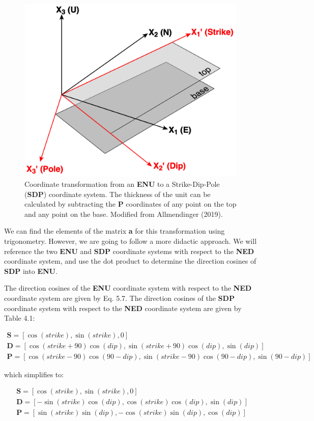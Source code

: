 \documentclass[a4paper , 12pt]{book}
\begin{document}
 \begin{figure}[H]
    \centering
    \includegraphics[width=11cm]{Figures/ch5f3.png}
    \caption{Coordinate transformation from an \textbf{ENU} to a Strike-Dip-Pole (\textbf{SDP}) coordinate system. The thickness of the unit can be calculated by subtracting the \textbf{P} coordinates of any point on the top and any point on the base. Modified from Allmendinger (2019).}
\end{figure}

We can find the elements of the matrix \textbf{a} for this transformation using trigonometry. However, we are going to follow a more didactic approach. We will reference the two \textbf{ENU} and \textbf{SDP} coordinate systems with respect to the \textbf{NED} coordinate system, and use the dot product to determine the direction cosines of \textbf{SDP} into \textbf{ENU}. 

The direction cosines of the \textbf{ENU} coordinate system with respect to the \textbf{NED} coordinate system are given by Eq. 5.7. The direction cosines of the \textbf{SDP} coordinate system with respect to the \textbf{NED} coordinate system are given by Table 4.1:

\begin{gather*}
    \mathbf{S} = [\cos(strike),\sin(strike),0] \\
    \mathbf{D} = [\cos(strike+90)\cos(dip),\sin(strike+90)\cos(dip),\sin(dip)] \\
    \mathbf{P} = [\cos(strike-90)\cos(90-dip),\sin(strike-90)\cos(90-dip),\sin(90-dip)]
\end{gather*}

which simplifies to:

\begin{equation}
    \begin{split}
        \mathbf{S} = [\cos(strike),\sin(strike),0] \hspace{70pt}  \\
        \mathbf{D} = [-\sin(strike)\cos(dip),\cos(strike)\cos(dip),\sin(dip)] \\
        \mathbf{P} = [\sin(strike)\sin(dip),-\cos(strike)\sin(dip),\cos(dip)]
    \end{split}
\end{equation}
\end{document}
